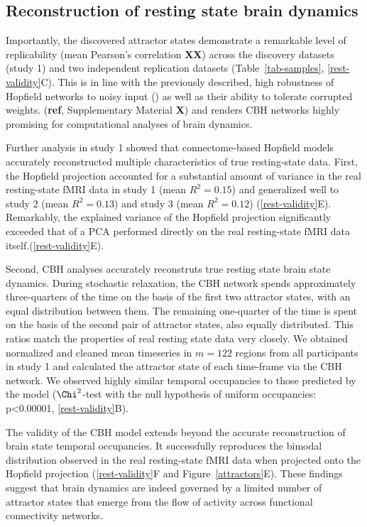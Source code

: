 \documentclass{article}
\begin{document}
\subsection{Reconstruction of resting state brain dynamics}\label{Reconstruction of resting state brain dynamics}

Importantly, the discovered attractor states demonstrate a remarkable level of replicability (mean Pearson's correlation \textbf{XX}) across the discovery datasets (study 1) and two independent replication datasets (Table~\ref{tab-samples}, \ref{rest-validity}C).
This is in line with the previously described, high robustness of Hopfield networks to noisy input (\href{https://doi.org/10.1073/pnas.79.8.2554}{}) as well as their ability to tolerate corrupted weights. (\textbf{ref}, Supplementary Material \textbf{X}) and renders CBH networks highly promising for computational analyses of brain dynamics.

Further analysis in study 1 showed that connectome-based Hopfield models accurately reconstructed multiple characteristics of true resting-state data.
First, the Hopfield projection accounted for a substantial amount of variance in the real resting-state fMRI data in study 1 (mean $R^2=0.15$) and generalized well to study 2 (mean $R^2=0.13$) and study 3 (mean $R^2=0.12$) (\ref{rest-validity}E).
Remarkably, the explained variance of the Hopfield projection significantly exceeded that of a PCA performed directly on the real resting-state fMRI data itself.(\ref{rest-validity}E).

Second, CBH analyses accurately reconstruts true resting state brain state dynamics.
During stochastic relaxation, the CBH network spends approximately three-quarters of the time on the basis of the first two attractor states, with an equal distribution between them.
The remaining one-quarter of the time is spent on the basis of the second pair of attractor states, also equally distributed.
This ratios match the properties of real resting state data very closely. We obtained normalized and cleaned mean timeseries in $m=122$ regions from all participants in study 1 and calculated the attractor state of each time-frame via the CBH network. We observed highly similar temporal occupancies to those predicted by the model ($\Chi^2$-test with the null hypothesis of uniform occupancies: p\textless 0.00001, \ref{rest-validity}B).

The validity of the CBH model extends beyond the accurate reconstruction of brain state temporal occupancies. It successfully reproduces the bimodal distribution observed in the real resting-state fMRI data when projected onto the Hopfield projection (\ref{rest-validity}F and Figure~\ref{attractors}E). These findings suggest that brain dynamics are indeed governed by a limited number of attractor states that emerge from the flow of activity across functional connectivity networks.
\end{document}
